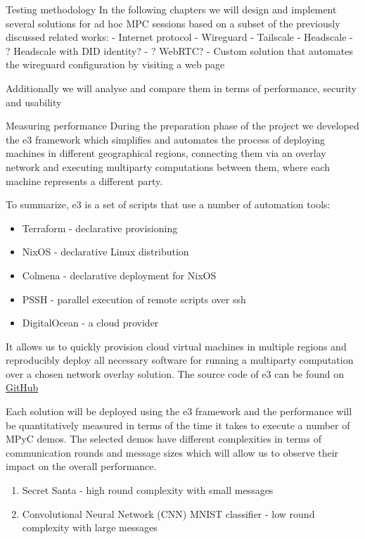 \begin{frame}{Testing methodology}
\protect\hypertarget{testing-methodology}{}
In the following chapters we will design and implement several solutions
for ad hoc MPC sessions based on a subset of the previously discussed
related works: - Internet protocol - Wireguard - Tailscale - Headscale -
? Headscale with DID identity? - ? WebRTC? - Custom solution that
automates the wireguard configuration by visiting a web page

Additionally we will analyse and compare them in terms of performance,
security and usability

\begin{block}{Measuring performance}
\protect\hypertarget{measuring-performance}{}
During the preparation phase of the project we developed the \gls{e3}
framework which simplifies and automates the process of deploying
machines in different geographical regions, connecting them via an
overlay network and executing multiparty computations between them,
where each machine represents a different party.

To summarize, \gls{e3} is a set of scripts that use a number of
automation tools:

\begin{itemize}
\tightlist
\item
  Terraform - declarative provisioning
\item
  NixOS - declarative Linux distribution
\item
  Colmena - declarative deployment for NixOS
\item
  PSSH - parallel execution of remote scripts over ssh
\item
  DigitalOcean - a cloud provider
\end{itemize}

It allows us to quickly provision cloud virtual machines in multiple
regions and reproducibly deploy all necessary software for running a
multiparty computation over a chosen network overlay solution. The
source code of \gls{e3} can be found on
\href{https://github.com/e-nikolov/mpyc}{GitHub}

Each solution will be deployed using the \gls{e3} framework and the
performance will be quantitatively measured in terms of the time it
takes to execute a number of MPyC demos. The selected demos have
different complexities in terms of communication rounds and message
sizes which will allow us to observe their impact on the overall
performance.

\begin{enumerate}
\tightlist
\item
  Secret Santa - high round complexity with small messages
\item
  Convolutional Neural Network (CNN) MNIST classifier - low round
  complexity with large messages
\end{enumerate}


\end{block}
\end{frame}
